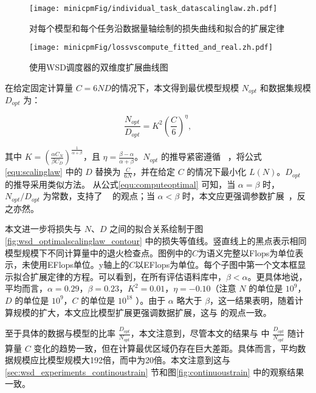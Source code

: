 \begin{figure}
    \centering
    \texttt{[image: minicpmFig/individual\_task\_datascalinglaw.zh.pdf]}
    \caption{对每个模型和每个任务沿数据量轴绘制的损失曲线和拟合的扩展定律}
    \label{fig:individual_task_datascalinglaw}
\end{figure}


\begin{figure}[!t]
    \centering
    \texttt{[image: minicpmFig/lossvscompute\_fitted\_and\_real.zh.pdf]}
    \caption{使用WSD调度器的双维度扩展曲线图}
    \label{fig:wsd_optimalscalinglaw}
\end{figure}

在给定固定计算量 $C = 6ND$的情况下，本文得到最优模型规模 $N_{opt}$ 和数据集规模 $D_{opt}$ 为： 

\begin{equation}
    \frac{N_{opt}}{D_{opt}} = K^2\left(\frac{C}{6}\right)^{\eta},
\label{equ:computeoptimal}
\end{equation}


其中 $K = (\frac{\alpha C_N}{\beta C_D})^{\frac{1}{\alpha + \beta}} $，且 $\eta=\frac{\beta - \alpha}{\alpha + \beta}$。$N_{opt}$ 的推导紧密遵循 ~\cite{hoffmann2022training}，将公式\ref{equ:scalinglaw} 中的 $D$ 替换为 $\frac{C}{6N}$，并在给定 $C$ 的情况下最小化 $L(N)$。$D_{opt}$ 的推导采用类似方法。 
从公式\ref{equ:computeoptimal} 可知，当 $\alpha = \beta$ 时，$N_{opt}/D_{opt}$ 为常数，支持了 ~\citet{hoffmann2022training} 的观点；当 $\alpha < \beta$ 时，本文应更强调参数扩展~\citep{kaplan2020scaling}，反之亦然。 

本文进一步将损失与 $N$、$D$ 之间的拟合关系绘制于图\ref{fig:wsd_optimalscalinglaw_contour} 中的损失等值线。竖直线上的黑点表示相同模型规模下不同计算量中的退火检查点。图例中的$C$为语义完整以Flops为单位表示，未使用EFlops单位。y轴上的$C$以EFlops为单位。每个子图中第一个文本框显示拟合扩展定律的方程。可以看到，在所有评估语料库中，$\beta < \alpha$。更具体地说，平均而言，$\alpha = 0.29$，$\beta = 0.23$，$K^2 = 0.01$，$\eta = -0.10$（注意 $N$ 的单位是 $10^9$，$D$ 的单位是 $10^9$，$C$ 的单位是 $10^{18}$ ）。由于 $\alpha$ 略大于 $\beta$，这一结果表明，随着计算规模的扩大，本文应比模型扩展更强调数据扩展，这与\citet{hoffmann2022training} 的观点一致。

至于具体的数据与模型的比率 $\frac{D_{opt}}{N_{opt}}$，本文注意到，尽管本文的结果与 \citet{hoffmann2022training} 中 $\frac{D_{opt}}{N_{opt}}$ 随计算量 $C$ 变化的趋势一致，但在计算最优区域仍存在巨大差距。具体而言，平均数据规模应比模型规模大192倍，而\citet{hoffmann2022training}中为20倍。本文注意到这与\ref{sec:wsd_experiments_continoustrain} 节和图\ref{fig:continuoustrain} 中的观察结果一致。




